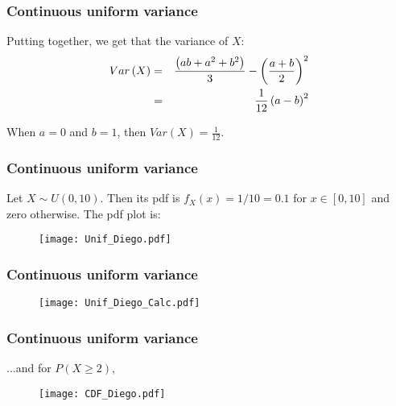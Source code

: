 \documentclass[notes=show,smaller,handout]{beamer}\usepackage[]{graphicx}\usepackage[]{color}
\begin{document}
\begin{frame}%

\frametitle{Continuous uniform variance}

Putting together, we get that the variance of $X$:%
\begin{eqnarray*}
Var\left( X\right) &=&\frac{\left( ab+a^{2}+b^{2}\right) }{3}-\left( \frac{%
a+b}{2}\right) ^{2} \\
&=&\frac{1}{12}\left( a-b\right) ^{2}
\end{eqnarray*}

\begin{example} [cont'd]
When $a=0$ and $b=1$, then $Var\left( X\right) =\frac{1}{12}$.
\end{example}
\end{frame}%


\begin{frame}%

\frametitle{Continuous uniform variance}

\begin{example}
Let $X \sim U(0,10)$. Then its pdf is $f_X(x) = 1/10=0.1$ for $x\in[0,10]$ and zero otherwise. The pdf plot is:

\begin{figure}[ptb]\centering
\texttt{[image: Unif\_Diego.pdf]}%
\end{figure}%

\end{example}
\end{frame}%


\begin{frame}%

\frametitle{Continuous uniform variance}

\begin{example}[cont'd]


\begin{figure}[ptb]\centering
\texttt{[image: Unif\_Diego\_Calc.pdf]}%
\end{figure}%



\end{example}
\end{frame}%

\begin{frame}%
\frametitle{Continuous uniform variance}

\begin{example}[cont'd]

...and for $P(X\geq 2)$,
\begin{figure}[ptb]\centering
\texttt{[image: CDF\_Diego.pdf]}%
\end{figure}%



\end{example}
\end{frame}%
\end{document}

